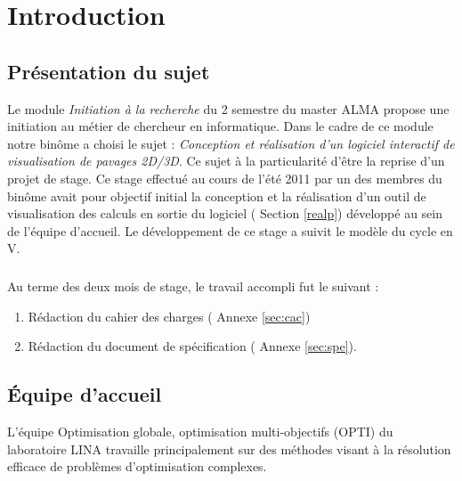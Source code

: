\chapter{Introduction}

\section{Présentation du sujet}
Le module \emph{Initiation à la recherche} du 2 semestre du master \textsc{ALMA} propose une initiation au métier de chercheur en informatique. Dans le cadre de ce module notre binôme a choisi le sujet : \emph{Conception et réalisation d’un logiciel interactif de visualisation de pavages 2D/3D}. Ce sujet à la particularité d'être la reprise d'un projet de stage. Ce stage effectué au cours de l'été 2011 par un des membres du binôme avait pour objectif initial la conception et la réalisation d'un outil de visualisation des calculs en sortie du logiciel \realpaver (\cf{} Section \ref{realp}) développé au sein de l'équipe d'accueil. Le développement de ce stage a suivit le modèle du cycle en V.

\paragraph{}
Au terme des deux mois de stage, le travail accompli fut le suivant :
\begin{enumerate}
\item 
Rédaction du cahier des charges (\cf{} Annexe \ref{sec:cac})
\item
Rédaction du document de spécification (\cf{} Annexe \ref{sec:spe}).
\end{enumerate} 



\section{Équipe d'accueil}
L'équipe Optimisation globale, optimisation multi-objectifs\cite{opti} (\textsc{OPTI}) du laboratoire \textsc{LINA}\cite{lina} travaille principalement sur des méthodes visant à la résolution efficace de problèmes d’optimisation complexes.  

